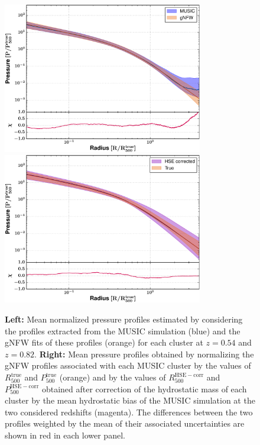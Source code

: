 \documentclass[twocolumn,traditabstract]{aa}
\begin{document}
\begin{figure}[h!]
\centering
\includegraphics[height=6.6cm]{MUSIC_compare_with_gNFW.pdf}
\hspace{0.6cm}
\includegraphics[height=6.6cm]{MUSIC_compare_HSE_corr.pdf}
\caption{{\footnotesize \textbf{Left:} Mean normalized pressure profiles estimated by considering the profiles extracted from the MUSIC simulation (blue) and the gNFW fits of these profiles (orange) for each cluster at $z=0.54$ and $z=0.82$. \textbf{Right:} Mean pressure profiles obtained by normalizing the gNFW profiles associated with each MUSIC cluster by the values of $R_{500}^{\mathrm{true}}$ and $P_{500}^{\mathrm{true}}$ (orange) and by the values of $R_{500}^{\mathrm{HSE-corr}}$ and $P_{500}^{\mathrm{HSE-corr}}$ obtained after correction of the hydrostatic mass of each cluster by the mean hydrostatic bias of the MUSIC simulation at the two considered redshifts (magenta). The differences between the two profiles weighted by the mean of their associated uncertainties are shown in red in each lower panel.}}
\label{fig:MUSIC_gNFW_HSE}
\end{figure}
\end{document}
